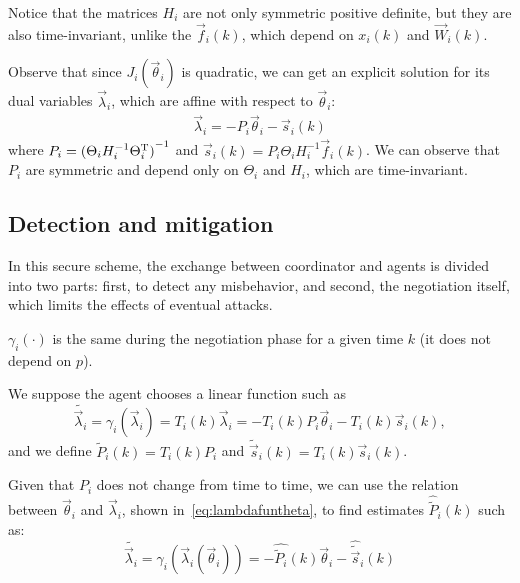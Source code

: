 \documentclass[a4paper, 10 pt, conference]{ieeeconf}  %
\begin{document}
Notice that the matrices $H_{i}$ are not only symmetric positive definite, but they are also \mbox{time-invariant}, unlike the $\vec{f}_{i}(k)$, which depend on $x_{i}(k)$ and $\vec{W}_{i}(k)$.

Observe that since $J_{i}(\vec{\theta}_{i})$ is quadratic, we can get an explicit  solution for its dual variables $\vec{\lambda}_{i}$, which are affine with respect to $\vec{\theta}_{i}$:
\begin{equation}
  \begin{aligned}
    \label{eq:lambdafuntheta}
    \vec{\lambda}_{i}=-P_{i}\vec{\theta}_{i}-\vec{s}_{i}(k)
  \end{aligned}
\end{equation}
where ${P_{i}={(\Theta_{i}H_{i}^{-1}\Theta_{i}^{\mathrm{T}})}^{-1}}$ and ${\vec{s}_{i}(k)=P_{i}\Theta_{i}H_{i}^{-1}\vec{f}_{i}(k)}$.
We can observe that $P_{i}$ are symmetric and depend only on $\Theta_{i}$ and $H_{i}$, which are time-invariant.


\subsection{Detection and mitigation}
In this secure scheme, the exchange between coordinator and agents  is divided into two parts: first, to detect any misbehavior, and second, the negotiation itself, which limits the effects of eventual attacks.


\begin{assumption}
  $\gamma_{i}(\cdot)$ is the same during the negotiation phase for a given time $k$ (it does not depend on $p$).
\end{assumption}

\begin{assumption}
  We suppose the agent chooses a linear function such as
  \begin{equation}
    \label{eq:linear_cheating}
    \tilde{\vec{\lambda}_{i}}=\gamma_{i}(\vec{\lambda}_{i})=T_{i}(k)\vec{\lambda}_{i}
       =-T_{i}(k)P_{i}\vec{\theta}_{i}-T_{i}(k)\vec{s}_{i}(k),
  \end{equation}
and we define $\tilde{P}_{i}(k)=T_{i}(k)P_{i}$ and $\tilde{\vec{s}}_{i}(k)=T_{i}(k)\vec{s}_{i}(k)$.
\end{assumption}


Given that $P_{i}$ does not change from time to time, we can use the relation between $\vec{\theta}_{i}$ and $\vec{\lambda}_{i}$, shown in~\eqref{eq:lambdafuntheta}, to find estimates $\widehat{\tilde{P}}_{i}(k)$ such as:
\begin{equation}
  \label{eq:lambdafuntheta_tilde}
\tilde{\vec{\lambda}_{i}}=\gamma_{i}(\vec{\lambda}_{i}(\vec{\theta}_{i}))=-\widehat{\tilde{P}_{i}}(k)\vec{\theta}_{i}-\widehat{\tilde{\vec{s}}}_{i}(k)
\end{equation}
\end{document}
